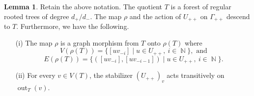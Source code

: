 \documentclass{article}
\DeclareMathOperator\out{out}
\DeclareMathOperator\bbN{\mathbb{N}}
\theoremstyle{definition}
\newtheorem{lemma}[theorem]{Lemma}
\begin{document}
\begin{lemma}\label{lem:properties_of_T}
Retain the above notation. The quotient $T$ is a forest of regular rooted trees of degree $d_+/d_-$. The map $\rho$ and the action of $U_{++}$ on $\Gamma_{++}$ descend to $T$. Furthermore, we have the following.
\begin{itemize}
  \item[(i)] The map $\rho$ is a graph morphism from $T$ onto $\rho(T)$ where
  \[V(\rho(T)) = \{[uv_{-i}]\mid u\in U_{++},\ i \in \bbN \}, \text{ and}\]
  \vspace{-0.4cm}  
  \[E(\rho(T)) = \{([uv_{-i}], [uv_{-i - 1}])\mid u\in U_{++},\ i \in \bbN\}.\]
  \item[(ii)] For every $v\in V(T)$, the stabilizer $(U_{++})_v$ acts transitively on $\out_{T}(v)$.
\end{itemize}
\end{lemma}
\end{document}
